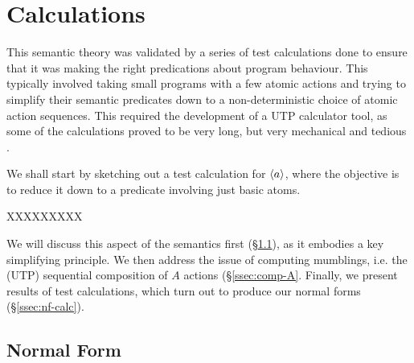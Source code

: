 \section{Calculations}\label{sec:calc}

This semantic theory was validated by a series of test calculations
done to ensure that it was making the right predications about program behaviour.
This typically involved taking small programs with a few atomic actions
and trying to simplify their semantic predicates
down to a non-deterministic choice of atomic action sequences.
This required the development of a UTP calculator tool,
as some of the calculations proved to be very long,
but very mechanical and tedious \cite{conf/utp/Butterfield16}.

We shall start by sketching out a test calculation for $\langle a\rangle$,
where the objective is to reduce it down to a predicate involving
just basic atoms.




XXXXXXXXX




We will discuss this aspect of the semantics first (\S\ref{ssec:normal-form}),
as it embodies a key simplifying principle.
We then address the issue of computing mumblings, i.e. the (UTP)
sequential composition of $A$ actions (\S\ref{ssec:comp-A}.
Finally, we present results of test calculations,
which turn out to produce our normal forms (\S\ref{ssec:nf-calc}).

\subsection{Normal Form}\label{ssec:normal-form}

